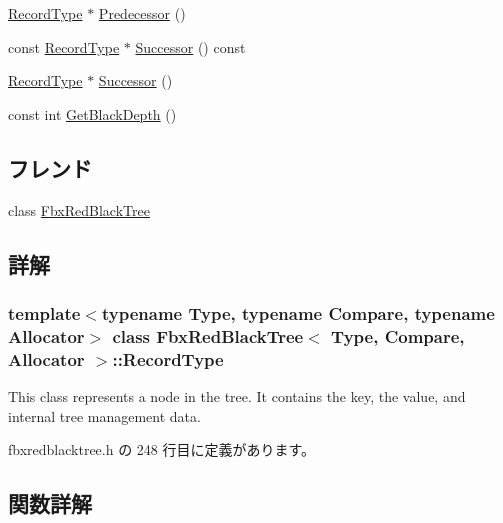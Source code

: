\begin{DoxyCompactItemize}
\item 
\hyperlink{class_fbx_red_black_tree_1_1_record_type}{Record\+Type} $\ast$ \hyperlink{class_fbx_red_black_tree_1_1_record_type_a425843b67a7fb4cc732427f058b76860}{Predecessor} ()
\item 
const \hyperlink{class_fbx_red_black_tree_1_1_record_type}{Record\+Type} $\ast$ \hyperlink{class_fbx_red_black_tree_1_1_record_type_add6f12144b2e60f2d209d160a4c4f1aa}{Successor} () const
\item 
\hyperlink{class_fbx_red_black_tree_1_1_record_type}{Record\+Type} $\ast$ \hyperlink{class_fbx_red_black_tree_1_1_record_type_a0af352fc345ec4bfe86ba8c0c79bb337}{Successor} ()
\item 
const int \hyperlink{class_fbx_red_black_tree_1_1_record_type_aa06dd811d4dfc30acc3143ed55215b17}{Get\+Black\+Depth} ()
\end{DoxyCompactItemize}
\subsection*{フレンド}
\begin{DoxyCompactItemize}
\item 
class \hyperlink{class_fbx_red_black_tree_1_1_record_type_ad58e9ce88250221aa6b5145e8ccc237f}{Fbx\+Red\+Black\+Tree}
\end{DoxyCompactItemize}


\subsection{詳解}
\subsubsection*{template$<$typename Type, typename Compare, typename Allocator$>$\newline
class Fbx\+Red\+Black\+Tree$<$ Type, Compare, Allocator $>$\+::\+Record\+Type}

This class represents a node in the tree. It contains the key, the value, and internal tree management data. 

 fbxredblacktree.\+h の 248 行目に定義があります。



\subsection{関数詳解}
\mbox{\label{class_fbx_red_black_tree_1_1_record_type_aa06dd811d4dfc30acc3143ed55215b17}} 
